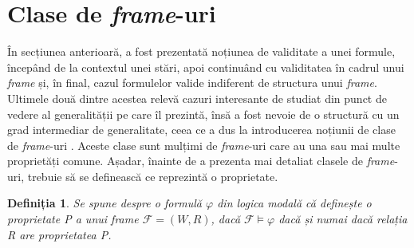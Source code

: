 \documentclass[12pt, openany]{book}
\newtheorem{definition}{Definiția}[chapter] %
\begin{document}
        \section{Clase de \textit{frame}-uri} %
        \label{section_frame_classes}
            \par{}
                În secțiunea anterioară, a fost prezentată noțiunea de validitate a unei formule, începând de la contextul unei
                stări, apoi continuând cu validitatea în cadrul unui \textit{frame} și, în final, cazul formulelor valide indiferent
                de structura unui \textit{frame}. Ultimele două dintre acestea relevă cazuri interesante de studiat din punct de vedere
                al generalității pe care îl prezintă, însă a fost nevoie de o structură cu un grad intermediar de generalitate, 
                ceea ce a dus la introducerea noțiunii de clase de \textit{frame}-uri \cite{modal_logic}. Aceste clase 
                sunt mulțimi de \textit{frame}-uri care au una sau mai multe proprietăți comune. Așadar, înainte de a prezenta
                mai detaliat clasele de \textit{frame}-uri, trebuie să se definească ce reprezintă o proprietate.

            \begin{definition}
            \label{def_property}
                Se spune despre o formulă $\varphi$ din logica modală că definește o proprietate P a unui \textit{frame} 
                $\mathcal{F}=(W,R)$, dacă $\mathcal{F} \vDash \varphi$ dacă și numai dacă relația R are proprietatea P.
            \end{definition}
            
\end{document}

